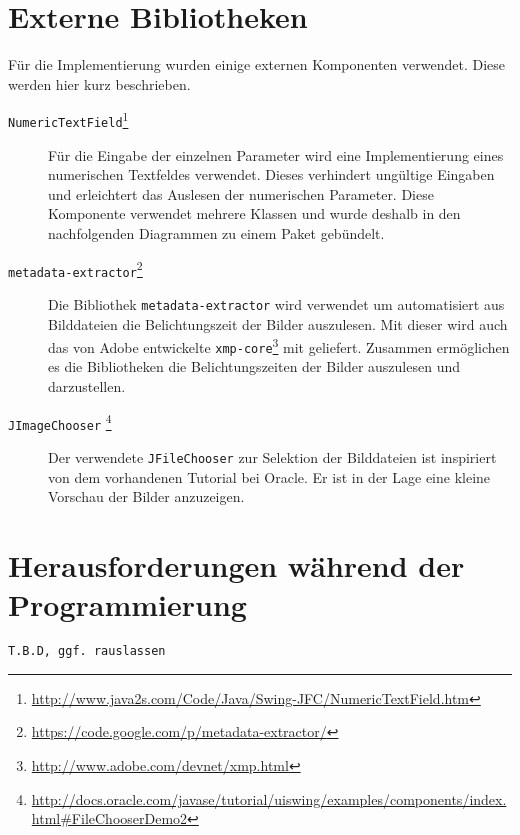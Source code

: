\section{Externe Bibliotheken}
\label{externals}
Für die Implementierung wurden einige externen Komponenten verwendet. Diese werden hier kurz beschrieben.
\begin{description}
\item[\texttt{NumericTextField}\footnote{\url{http://www.java2s.com/Code/Java/Swing-JFC/NumericTextField.htm}}]
Für die Eingabe der einzelnen Parameter wird eine Implementierung eines numerischen Textfeldes verwendet. Dieses verhindert ungültige Eingaben und erleichtert das Auslesen der numerischen Parameter. Diese Komponente verwendet mehrere Klassen und wurde deshalb in den nachfolgenden Diagrammen zu einem Paket gebündelt.

\item[\texttt{metadata-extractor}\footnote{\url{https://code.google.com/p/metadata-extractor/}}]
Die Bibliothek \texttt{metadata-extractor} wird verwendet um automatisiert aus Bilddateien die Belichtungszeit der Bilder auszulesen. Mit dieser wird auch das von Adobe entwickelte \texttt{xmp-core}\footnote{\url{http://www.adobe.com/devnet/xmp.html}} mit geliefert. Zusammen ermöglichen es die Bibliotheken die Belichtungszeiten der Bilder auszulesen und darzustellen.

\item[\texttt{JImageChooser} \footnote{\url{http://docs.oracle.com/javase/tutorial/uiswing/examples/components/index.html\#FileChooserDemo2}}]
Der verwendete \texttt{JFileChooser} zur Selektion der Bilddateien ist inspiriert von dem vorhandenen Tutorial bei Oracle. Er ist in der Lage eine kleine Vorschau der Bilder anzuzeigen.
\end{description}

\section{Herausforderungen während der Programmierung}

\texttt{T.B.D, ggf. rauslassen}